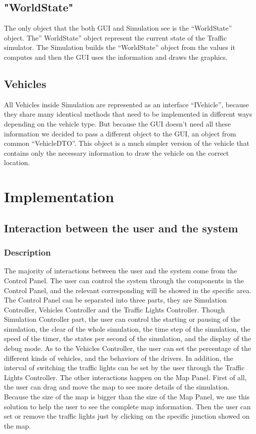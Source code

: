 \documentclass[a4paper,12pt]{article}
\begin{document}
 	\subsection{"WorldState"}
 	The only object that the both GUI and Simulation see is the “WorldState” object. The” WorldState” object represent the current state of the Traffic simulator. The Simulation builds the “WorldState” object from the values it computes and then the GUI uses the information and draws the graphics.
 	\subsection{Vehicles}
 	All Vehicles inside Simulation are represented as an interface “IVehicle”, because they share many identical methods that need to be implemented in different ways depending on the vehicle type. But because the GUI doesn’t need all these information we decided to pass a different object to the GUI, an object from common “VehicleDTO”. This object is a much simpler version of the vehicle that contains only the necessary information to draw the vehicle on the correct location.

\section{Implementation}
\subsection{Interaction between the user and the system}
\subsubsection{Description} The majority of interactions between the user and the system come from the Control Panel. The user can control the system through the components in the Control Panel, and the relevant corresponding will be showed in the specific area. The Control Panel can be separated into three parts, they are Simulation Controller, Vehicles Controller and the Traffic Lights Controller. Though Simulation Controller part, the user can control the starting or pausing of the simulation, the clear of the whole simulation, the time step of the simulation, the speed of the timer, the states per second of the simulation, and the display of the debug mode. As to the Vehicles Controller, the user can set the percentage of the different kinds of vehicles, and the behaviors of the drivers. In addition, the interval of switching the traffic lights can be set by the user through the Traffic Lights Controller.
The other interactions happen on the Map Panel. First of all, the user can drag and move the map to see more details of the simulation. Because the size of the map is bigger than the size of the Map Panel, we use this solution to help the user to see the complete map information. Then the user can set or remove the traffic lights just by clicking on the specific junction showed on the map.
\end{document}
